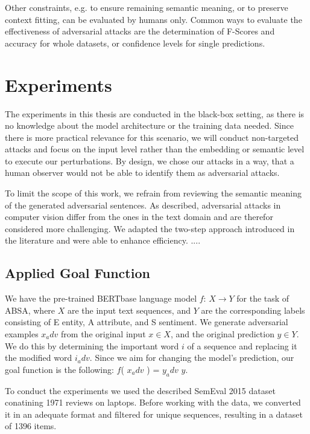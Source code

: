 Other constraints, e.g. to ensure remaining semantic meaning, or to preserve context fitting, can be evaluated by humans only. 
Common ways to evaluate the effectiveness of adversarial attacks are the determination of F-Scores and accuracy for whole datasets, or confidence levels for single predictions. 

\section{Experiments}
\label{sec:experiments}

The experiments in this thesis are conducted in the black-box setting, as there is no knowledge about the model architecture or the training data needed. Since there is more practical relevance for this scenario, we will conduct non-targeted attacks and focus on the input level rather than the embedding or semantic level to execute our perturbations. 
By design, we chose our attacks in a way, that a human observer would not be able to identify them as adversarial attacks. 

To limit the scope of this work, we refrain from reviewing the semantic meaning of the generated adversarial sentences.
As described, adversarial attacks in computer vision differ from the ones in the text domain and are therefor considered more challenging. We adapted the two-step approach introduced in the literature and were able to enhance efficiency. 
....

\subsection{Applied Goal Function}
 \label{sec:goal_function_m}
We have the pre-trained BERTbase language model $f$: ${X \rightarrow Y}$ for the task of ABSA, where $X$ are the input text sequences, and $Y$ are the corresponding labels consisting of E entity, A attribute, and S sentiment. We generate adversarial examples ${x_adv}$ from the original input $x \in X$, and the original prediction $y \in Y$. We do this by determining the important word $i$ of a sequence and replacing it the modified word $i_adv$. Since we aim for changing the model's prediction, our goal function is the following: 
$f$( $x_adv$ ) = $y_adv$ \neq $y$.


To conduct the experiments we used the described SemEval 2015 dataset conatining 1971 reviews on laptops. Before working with the data, we converted it in an adequate format and filtered for unique sequences, resulting in a dataset of 1396 items. 

